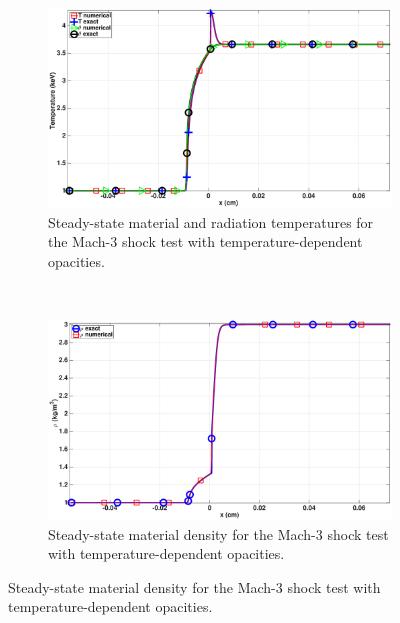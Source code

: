 \documentclass[times,doublespace]{fldauth}%
\begin{document}
\begin{figure}[H]
    \begin{subfigure}{0.5\textwidth}
    \centering
    \includegraphics[width=\linewidth]{figures/dpt-xs/mach_3_nel_1000_temperature.eps}
    \caption{Steady-state material and radiation temperatures for the Mach-3 shock test with temperature-dependent opacities.}\label{fig:mach-3-dpt-xs-temp}
    \end{subfigure}
    ~
    \begin{subfigure}{0.5\textwidth}
    \centering
    \includegraphics[width=\linewidth]{figures/dpt-xs/mach_3_nel_1000_density.eps}
    \caption{Steady-state material density for the Mach-3 shock test with temperature-dependent opacities.}\label{fig:mach-3-dpt-xs-dens}
    \end{subfigure}
    

\end{figure}
\end{document}
